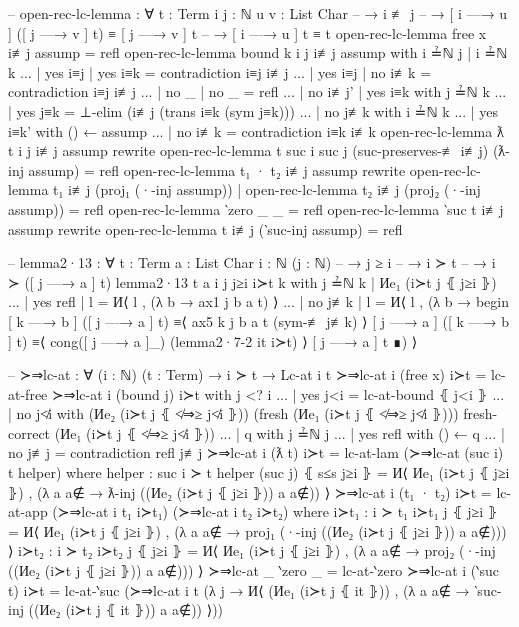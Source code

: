 \documentclass[logo,bsc,singlespacing,parskip,online]{infthesis}
\renewenvironment{code}{\mintedcopy[breaklines,breaksymbolleft=\;]{agda}}{\endmintedcopy}
\begin{document}
\begin{code}
-- open-rec-lc-lemma : ∀ {t : Term} {i j : ℕ} {u v : List Char}
--   → i ≢ j
--   → [ i —→ u ] ([ j —→ v ] t) ≡ [ j —→ v ] t
--   → [ i —→ u ] t ≡ t
open-rec-lc-lemma {free x} i≢j assump = refl
open-rec-lc-lemma {bound k} {i} {j} i≢j assump
  with i ≟ℕ j | i ≟ℕ k
... | yes i≡j | yes i≡k = contradiction i≡j i≢j
... | yes i≡j | no  i≢k = contradiction i≡j i≢j
... | no  _   | no  _   = refl
... | no i≢j' | yes i≡k with j ≟ℕ k
...   | yes j≡k = ⊥-elim (i≢j (trans i≡k (sym j≡k)))
...   | no  j≢k with i ≟ℕ k
...     | yes i≡k' with () ← assump
...     | no  i≢k  = contradiction i≡k i≢k
open-rec-lc-lemma {ƛ t} {i} {j} i≢j assump
  rewrite open-rec-lc-lemma {t} {suc i} {suc j}
      (suc-preserves-≢ i≢j)
      (ƛ-inj assump)
    = refl
open-rec-lc-lemma {t₁ · t₂} i≢j assump
  rewrite
    open-rec-lc-lemma {t₁} i≢j (proj₁ (·-inj assump))
   | open-rec-lc-lemma {t₂} i≢j (proj₂ (·-inj assump))
  = refl
open-rec-lc-lemma {‵zero} _ _ = refl
open-rec-lc-lemma {‵suc t} i≢j assump
  rewrite open-rec-lc-lemma {t} i≢j (‵suc-inj assump) = refl

-- lemma2·13 : ∀ {t : Term} {a : List Char} {i : ℕ} (j : ℕ)
--   → j ≥ i
--   → i ≻ t
--   → i ≻ ([ j —→ a ] t)
lemma2·13 {t} {a} {i} j j≥i i≻t k
  with j ≟ℕ k | Иe₁ (i≻t j ⦃ j≥i ⦄)
... | yes refl | l = И⟨ l , (λ b → ax1 j b a t) ⟩
... | no  j≢k  | l = И⟨ l , (λ b →
  begin
    [ k —→ b ] ([ j —→ a ] t)
  ≡⟨ ax5 k j b a t (sym-≢ j≢k) ⟩
    [ j —→ a ] ([ k —→ b ] t)
  ≡⟨ cong([ j —→ a ]_) (lemma2·7-2 it i≻t) ⟩
    [ j —→ a ] t
  ∎) ⟩

-- ≻⇒lc-at : ∀ (i : ℕ) (t : Term) → i ≻ t → Lc-at i t
≻⇒lc-at i (free x) i≻t = lc-at-free
≻⇒lc-at i (bound j) i≻t with j <? i
... | yes j<i = lc-at-bound ⦃ j<i ⦄
... | no  j≮i with
  (Иe₂ (i≻t j ⦃ ≮⇒≥ j≮i ⦄))
    (fresh (Иe₁ (i≻t j ⦃ ≮⇒≥ j≮i ⦄)))
    {fresh-correct (Иe₁ (i≻t j ⦃ ≮⇒≥ j≮i ⦄))}
...   | q with j ≟ℕ j
...     | yes refl with () ← q
...     | no  j≢j  = contradiction refl j≢j
≻⇒lc-at i (ƛ t) i≻t = lc-at-lam (≻⇒lc-at (suc i) t helper)
  where
    helper : suc i ≻ t
    helper (suc j) ⦃ s≤s j≥i ⦄ =
      И⟨ Иe₁ (i≻t j ⦃ j≥i ⦄)
      , (λ a {a∉} → ƛ-inj ((Иe₂ (i≻t j ⦃ j≥i ⦄)) a {a∉})) ⟩
≻⇒lc-at i (t₁ · t₂) i≻t =
  lc-at-app (≻⇒lc-at i t₁ i≻t₁) (≻⇒lc-at i t₂ i≻t₂)
  where
    i≻t₁ : i ≻ t₁
    i≻t₁ j ⦃ j≥i ⦄ =
      И⟨ Иe₁ (i≻t j ⦃ j≥i ⦄)
      , (λ a {a∉} → proj₁ (·-inj ((Иe₂ (i≻t j ⦃ j≥i ⦄)) a {a∉})))
      ⟩
    i≻t₂ : i ≻ t₂
    i≻t₂ j ⦃ j≥i ⦄ =
      И⟨ Иe₁ (i≻t j ⦃ j≥i ⦄)
      , (λ a {a∉} → proj₂ (·-inj ((Иe₂ (i≻t j ⦃ j≥i ⦄)) a {a∉})))
      ⟩
≻⇒lc-at _ ‵zero _ = lc-at-‵zero
≻⇒lc-at i (‵suc t) i≻t = lc-at-‵suc (≻⇒lc-at i t (λ j →
  И⟨ (Иe₁ (i≻t j ⦃ it ⦄))
  , (λ a {a∉} → ‵suc-inj ((Иe₂ (i≻t j ⦃ it ⦄)) a {a∉})) ⟩))


\end{code}
\end{document}
